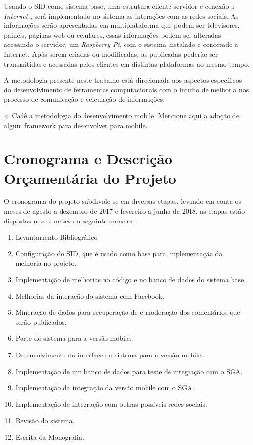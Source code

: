 \documentclass[
	12pt,				%
	openright,			%
	oneside,			%
	a4paper,			%
	english,			%
	french,				%
	spanish,			%
	brazil,				%
	]{abntex2}
\newcommand{\danielobs}[1]{{\color{red} $\diamond$ #1}}
\begin{document}
	Usando o SID como sistema base, uma estrutura cliente-servidor e conexão a \textit{Internet} , será implementado no sistema as interações com as redes sociais. As informações serão apresentadas em multiplataforma que podem ser televisores, painéis, paginas web ou celulares, essas informações podem ser alteradas acessando o servidor, um \textit{Raspberry Pi}, com o sistema instalado e conectado a Internet. Após serem criadas ou modificadas, as publicadas poderão ser transmitidas e acessadas pelos clientes em distintas plataformas ao mesmo tempo.
	
	A metodologia presente neste trabalho está direcionada aos aspectos específicos	do desenvolvimento de ferramentas computacionais com o intuito de melhoria nos processo de comunicação e veiculação de informações.
	
	\danielobs{Cadê a metodologia do desenvolvimento mobile. Mencione aqui a adoção de algum framework para desenvolver para mobile.}
	
\section*{Cronograma e Descrição Orçamentária do Projeto}
	 O cronograma do projeto subdivide-se em diversas etapas, levando em conta os meses de agosto a dezembro de 2017 e fevereiro a junho de 2018, as etapas estão dispostas nesses meses da seguinte maneira:

	\begin{enumerate}[label=\Roman*)]
	\item Levantamento Bibliográfico
	
	\item Configuração do SID, que é usado como base para implementação da melhoria no projeto.
	
	\item Implementação de melhorias no código e no banco de dados do sistema base.
	
	\item Melhorias da interação do sistema com Facebook.
	
	\item Mineração de dados para recuperação de e moderação dos comentários que serão publicados.
	
	\item Porte do sistema para a versão mobile.
	
	\item Desenvolvimento da interface do sistema para a versão mobile.
	
	\item Implementação de um banco de dados para teste de integração com o SGA.
	
	\item Implementação da integração da versão mobile com o SGA.
	
	\item Implementação de integração com outras possíveis redes sociais.
	
	\item Revisão do sistema.
	
	\item Escrita da Monografia.
	
	\end{enumerate}
\end{document}
